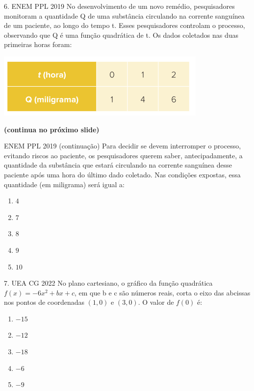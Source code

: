 \documentclass[11pt]{beamer}
\begin{document}
\begin{frame}{6. ENEM PPL 2019}
    No desenvolvimento de um novo remédio, pesquisadores monitoram a quantidade Q de uma substância circulando na corrente sanguínea de um paciente, ao longo do tempo t. Esses pesquisadores controlam o processo, observando que Q é uma função quadrática de t. Os dados coletados nas duas primeiras horas foram:

    \begin{center}
        \includegraphics[scale=0.5]{imagens/enem-ppl-2019.png}
    \end{center} \textbf{(continua no próximo slide)}
\end{frame}

\begin{frame}{ENEM PPL 2019 (continuação)}
    Para decidir se devem interromper o processo, evitando riscos ao paciente, os pesquisadores querem saber, antecipadamente, a quantidade da substância que estará circulando na corrente sanguínea desse paciente após uma hora do último dado coletado. Nas condições expostas, essa quantidade (em miligrama) será igual a:

    \begin{enumerate}[a]
        \item $4$
        \item $7$ %
        \item $8$ 
        \item $9$ 
        \item $10$ 
    \end{enumerate}
\end{frame}

\begin{frame}{7. UEA CG 2022}
    No plano cartesiano, o gráfico da função quadrática $f(x)=-6x^{2}+bx+c$, em que b e c são números reais, corta o eixo das abcissas nos pontos de coordenadas $(1,0)$ e $(3,0)$. O valor de $f(0)$ é:

    \begin{enumerate}[a]
        \item $-15$
        \item $-12$ 
        \item $-18$ %
        \item $-6$ 
        \item $-9$ 
    \end{enumerate}
\end{frame}
\end{document}
